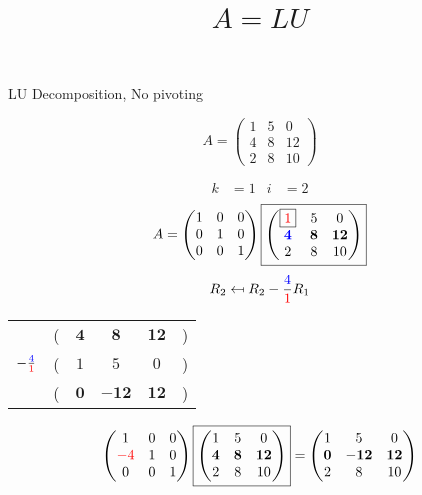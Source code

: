 \documentclass[pdf]{beamer}
\title{$A=LU$}
\subtitle{}
\author{}
\begin{document}
\begin{frame}{}
\begin{center}LU Decomposition, No pivoting\end{center} $$A = \begin{pmatrix}1&5&0\\4&8&12\\2&8&10\end{pmatrix}$$\end{frame}
\begin{frame}{}\begin{align*} k &= 1 & i &= 2 \end{align*} $$A=\begin{pmatrix}1&0&0\\0&1&0\\0&0&1\end{pmatrix} \boxed{\begin{pmatrix}\boxed{{\color{red}1}}&5&0\\\mathbf{{\color{blue}4}}&\mathbf{8}&\mathbf{12}\\2&8&10\end{pmatrix}} $$ $$R_2 \mapsfrom R_2 - \frac{{\color{blue}4}}{{\color{red}1}} R_1$$ \begin{center}\begin{tabular}{cccccc}  &(& $ \mathbf{4} $ & $ \mathbf{8} $ & $ \mathbf{12} $ &)\\$ -\frac{{\color{blue}4}}{{\color{red}1}} $&(& $ 1 $ & $ 5 $ & $ 0 $ &)\\\hline  &(& $ \mathbf{0} $ & $ \mathbf{-12} $ & $ \mathbf{12} $ &) \end{tabular}\end{center} $$ \begin{pmatrix}1&0&0\\{\color{red}-4}&1&0\\0&0&1\end{pmatrix} \boxed{\begin{pmatrix}1&5&0\\\mathbf{4}&\mathbf{8}&\mathbf{12}\\2&8&10\end{pmatrix}} = \begin{pmatrix}1&5&0\\\mathbf{0}&\mathbf{-12}&\mathbf{12}\\2&8&10\end{pmatrix} $$\end{frame}
\end{document}
